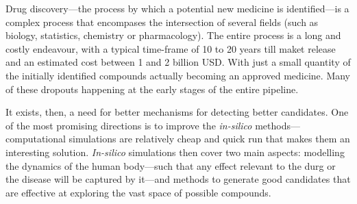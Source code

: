 \documentclass{article}
\begin{document}
    
    


Drug discovery—the process by which a potential new medicine is identified---is a
 complex process that encompases the intersection of several fields (such as biology,
 statistics, chemistry or pharmacology). The entire process is a long and costly
 endeavour, with a typical time-frame of 10 to 20 years till maket release and an
 estimated cost between 1 and 2 billion USD. With just a small quantity of the initially
 identified compounds actually becoming an approved medicine. Many of these dropouts
 happening at the early stages of the entire pipeline.

It exists, then, a need for better mechanisms for detecting better candidates. One of
 the most promising directions is to improve the \emph{in-silico}
 methods---computational simulations are relatively cheap and quick run that makes them
 an interesting solution. \emph{In-silico} simulations then cover two main aspects:
 modelling the dynamics of the human body---such that any effect relevant to the durg or
 the disease will be captured by it---and methods to generate good candidates that are
 effective at exploring the vast space of possible compounds.


\end{document}
